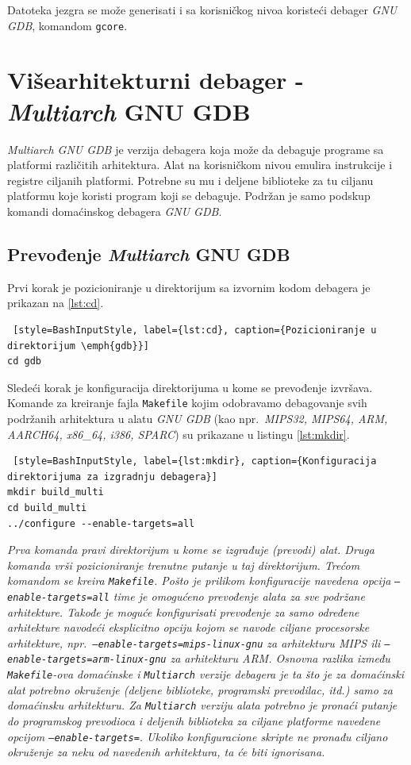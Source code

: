 \documentclass[12pt,oneside]{memoir}
\begin{document}
Datoteka jezgra se može generisati i sa korisničkog nivoa koristeći debager \emph{GNU GDB},  komandom \texttt{gcore}.

\section{Višearhitekturni debager - \emph{Multiarch} GNU GDB}

\emph{Multiarch GNU GDB} je verzija debagera koja može da debaguje programe sa platformi različitih arhitektura. Alat na korisničkom nivou emulira instrukcije i registre ciljanih platformi. Potrebne su mu i deljene biblioteke za tu ciljanu platformu koje koristi program koji se debaguje. Podržan je samo podskup komandi domaćinskog debagera \emph{GNU GDB}.

\subsection{Prevođenje \emph{Multiarch} GNU GDB}

Prvi korak je pozicioniranje u direktorijum sa izvornim kodom debagera je prikazan na \ref{lst:cd}.
\begin{lstlisting} [style=BashInputStyle, label={lst:cd}, caption={Pozicioniranje u direktorijum \emph{gdb}}]
cd gdb
\end{lstlisting}
Sledeći korak je konfiguracija direktorijuma u kome se prevođenje izvršava. Komande za kreiranje fajla \texttt{Makefile} kojim odobravamo debagovanje svih podržanih arhitektura u alatu \emph{GNU GDB} (kao npr.~\emph{MIPS32, MIPS64, ARM, AARCH64, x86\_64, i386, SPARC}) su prikazane u listingu \ref{lst:mkdir}.

\begin{lstlisting} [style=BashInputStyle, label={lst:mkdir}, caption={Konfiguracija direktorijuma za izgradnju debagera}]
mkdir build_multi
cd build_multi
../configure --enable-targets=all

\end{lstlisting}
\emph{Prva komanda pravi direktorijum u kome se izgrađuje (prevodi) alat. Druga komanda vrši pozicioniranje trenutne putanje u taj direktorijum. Trećom komandom se kreira \texttt{Makefile}. Pošto je prilikom konfiguracije navedena opcija \texttt{--enable-targets=all} time je omogućeno prevođenje alata za sve podržane arhitekture. Takođe je moguće konfigurisati prevođenje za samo određene arhitekture navodeći eksplicitno opciju kojom se navode ciljane procesorske arhitekture, npr.~\texttt{–enable-targets=mips-linux-gnu} za arhitekturu \emph{MIPS} ili \texttt{–enable-targets=arm-linux-gnu} za arhitekturu \emph{ARM}. Osnovna razlika između \texttt{Makefile}-ova domaćinske i \texttt{Multiarch} verzije debagera je ta što je za domaćinski alat potrebno okruženje (deljene biblioteke, programski prevodilac, itd.) samo za domaćinsku arhitekturu. Za \texttt{Multiarch} verziju alata potrebno je pronaći putanje do programskog prevodioca i deljenih biblioteka za ciljane platforme navedene opcijom \texttt{--enable-targets=}. Ukoliko konfiguracione skripte ne pronađu ciljano okruženje za neku od navedenih arhitektura, ta će biti ignorisana.}
\end{document}
